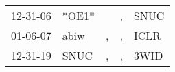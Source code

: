 \begin{supertabular}{lllll}
 12-31-06 &  *OE1* &    &  , &  SNUC \\
 01-06-07 &   abiw &  , &  , &  ICLR \\
 12-31-19 &   SNUC &  , &  , &  3WID \\
\end{supertabular}
